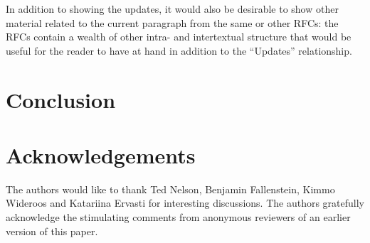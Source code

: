 In addition to showing the updates, 
it would also be desirable to show other
material related to the current paragraph from the same or other RFCs:
the RFCs contain a wealth of other intra- and intertextual structure
that would be useful for the reader to have at hand
in addition to the ``Updates'' relationship.





\section{Conclusion}



\section{Acknowledgements}

The authors would like to thank Ted Nelson, Benjamin Fallenstein,
Kimmo Wideroos and Katariina Ervasti for interesting discussions.  The
authors gratefully acknowledge the stimulating comments from anonymous
reviewers of an earlier version of this paper.



 

